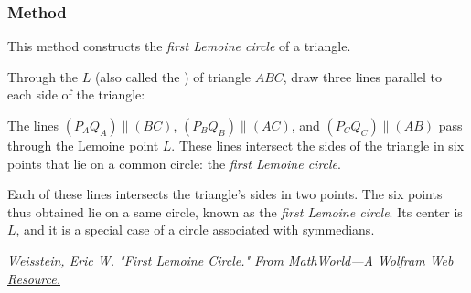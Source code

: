 \vspace{1em}
\begin{minipage}{.5\textwidth}
\begin{center}
\end{center}
\end{minipage}
\begin{minipage}{.5\textwidth}
\begin{tkzexample}
\end{tkzexample}
\end{minipage}

\subsubsection{Method }
\label{ssub:method_triangle_first_lemoine_circle}

This method constructs the \emph{first Lemoine circle} of a triangle.

Through the  $L$ (also called the ) of triangle $ABC$, draw three lines parallel to each side of the triangle:

The lines \( (P_AQ_A) \parallel (BC) \), \( (P_BQ_B) \parallel (AC) \), and \( (P_CQ_C) \parallel (AB) \) pass through the Lemoine point \( L \). These lines intersect the sides of the triangle in six points that lie on a common circle: the \emph{first Lemoine circle}.

Each of these lines intersects the triangle’s sides in two points. The six points thus obtained lie on a same circle, known as the \emph{first Lemoine circle}. Its center is $L$, and it is a special case of a circle associated with symmedians.
\begin{flushright}
\small
\href{https://mathworld.wolfram.com/FirstLemoineCircle.html}
{\textit{Weisstein, Eric W. "First Lemoine Circle." From MathWorld—A Wolfram Web Resource.}}
\end{flushright}

